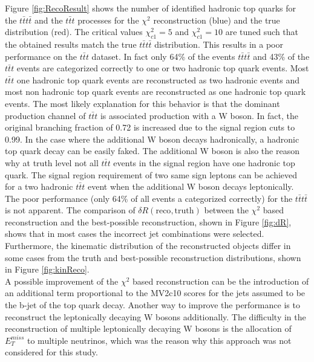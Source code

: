 \vspace{-0.01cm}

Figure \ref{fig:RecoResult} shows the number of identified hadronic top quarks for the $t\bar{t}t\bar{t}$ and the $t\bar{t}t$ processes for the $\chi^2$ reconstruction (blue) and the true distribution (red). The critical values $\chi^2_{c1} = 5$ and $\chi^2_{c1} = 10$ are tuned such that the obtained results match the true $t\bar{t}t\bar{t}$ distribution. This results in a poor performance on the $t\bar{t}t$ dataset. In fact only 64\% of the events $t\bar{t}t\bar{t}$ and 43\% of the $t\bar{t}t$ events are categorized correctly to one or two hadronic top quark events. Most $t\bar{t}t$ one hadronic top quark events are reconstructed as two hadronic events and most non hadronic top quark events are reconstructed as one hadronic top quark events. The most likely explanation for this behavior is that the dominant production channel of $t\bar{t}t$ is associated production with a W boson. In fact, the original branching fraction of 0.72 is increased due to the signal region cuts to 0.99. In the case where the additional W boson decays hadronically, a hadronic top quark decay can be easily faked. The additional W boson is also the reason why at truth level not all $t\bar{t}t$ events in the signal region have one hadronic top quark. The signal region requirement of two same sign leptons can be achieved for a two hadronic $t\bar{t}t$ event when the additional W boson decays leptonically. \\
The poor performance (only 64\% of all events a categorized correctly) for the $t\bar{t}t\bar{t}$ is not apparent. The comparison of $\delta R(\text{reco},\text{truth})$ between the $\chi^2$ based reconstruction and the best-possible reconstruction, shown in Figure \ref{fig:dR}, shows that in most cases the incorrect jet combinations were selected. Furthermore, the kinematic distribution of the reconstructed objects differ in some cases from the truth and best-possible reconstruction distributions, shown in Figure \ref{fig:kinReco}. \\
A possible improvement of the $\chi^2$ based reconstruction can be the introduction of an additional term proportional to the MV2c10 scores for the jets assumed to be the b-jet of the top quark decay. Another way to improve the performance is to reconstruct the leptonically decaying W  bosons additionally. The difficulty in the reconstruction of multiple leptonically decaying W bosons is the allocation of $E_{T}^{miss}$ to multiple neutrinos, which was the reason why this approach was not considered for this study.

